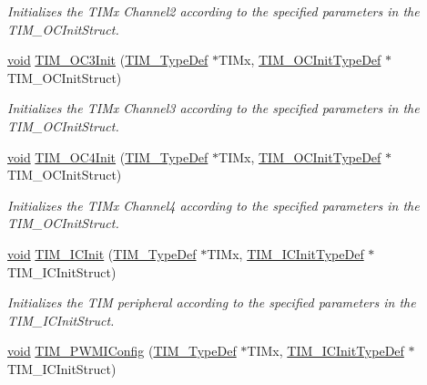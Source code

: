 \begin{DoxyCompactItemize}
\begin{DoxyCompactList}\small\item\em Initializes the T\+I\+Mx Channel2 according to the specified parameters in the T\+I\+M\+\_\+\+O\+C\+Init\+Struct. \end{DoxyCompactList}\item 
\hyperlink{usb__devapi_8h_afabf60e7f57651d6d595a02c75f07cd0}{void} \hyperlink{group___t_i_m___private___functions_ga90d4a358d4e6d4c5ed17dc1d6beb5f30}{T\+I\+M\+\_\+\+O\+C3\+Init} (\hyperlink{struct_t_i_m___type_def}{T\+I\+M\+\_\+\+Type\+Def} $\ast$T\+I\+Mx, \hyperlink{struct_t_i_m___o_c_init_type_def}{T\+I\+M\+\_\+\+O\+C\+Init\+Type\+Def} $\ast$T\+I\+M\+\_\+\+O\+C\+Init\+Struct)
\begin{DoxyCompactList}\small\item\em Initializes the T\+I\+Mx Channel3 according to the specified parameters in the T\+I\+M\+\_\+\+O\+C\+Init\+Struct. \end{DoxyCompactList}\item 
\hyperlink{usb__devapi_8h_afabf60e7f57651d6d595a02c75f07cd0}{void} \hyperlink{group___t_i_m___private___functions_ga64571ebbb58cac39a9e760050175f11c}{T\+I\+M\+\_\+\+O\+C4\+Init} (\hyperlink{struct_t_i_m___type_def}{T\+I\+M\+\_\+\+Type\+Def} $\ast$T\+I\+Mx, \hyperlink{struct_t_i_m___o_c_init_type_def}{T\+I\+M\+\_\+\+O\+C\+Init\+Type\+Def} $\ast$T\+I\+M\+\_\+\+O\+C\+Init\+Struct)
\begin{DoxyCompactList}\small\item\em Initializes the T\+I\+Mx Channel4 according to the specified parameters in the T\+I\+M\+\_\+\+O\+C\+Init\+Struct. \end{DoxyCompactList}\item 
\hyperlink{usb__devapi_8h_afabf60e7f57651d6d595a02c75f07cd0}{void} \hyperlink{group___t_i_m___private___functions_ga9e6a153dd6552e4e1188eba227316f7f}{T\+I\+M\+\_\+\+I\+C\+Init} (\hyperlink{struct_t_i_m___type_def}{T\+I\+M\+\_\+\+Type\+Def} $\ast$T\+I\+Mx, \hyperlink{struct_t_i_m___i_c_init_type_def}{T\+I\+M\+\_\+\+I\+C\+Init\+Type\+Def} $\ast$T\+I\+M\+\_\+\+I\+C\+Init\+Struct)
\begin{DoxyCompactList}\small\item\em Initializes the T\+IM peripheral according to the specified parameters in the T\+I\+M\+\_\+\+I\+C\+Init\+Struct. \end{DoxyCompactList}\item 
\hyperlink{usb__devapi_8h_afabf60e7f57651d6d595a02c75f07cd0}{void} \hyperlink{group___t_i_m___private___functions_gaa71f9296556310f85628d6c748a06475}{T\+I\+M\+\_\+\+P\+W\+M\+I\+Config} (\hyperlink{struct_t_i_m___type_def}{T\+I\+M\+\_\+\+Type\+Def} $\ast$T\+I\+Mx, \hyperlink{struct_t_i_m___i_c_init_type_def}{T\+I\+M\+\_\+\+I\+C\+Init\+Type\+Def} $\ast$T\+I\+M\+\_\+\+I\+C\+Init\+Struct)

\end{DoxyCompactItemize}
